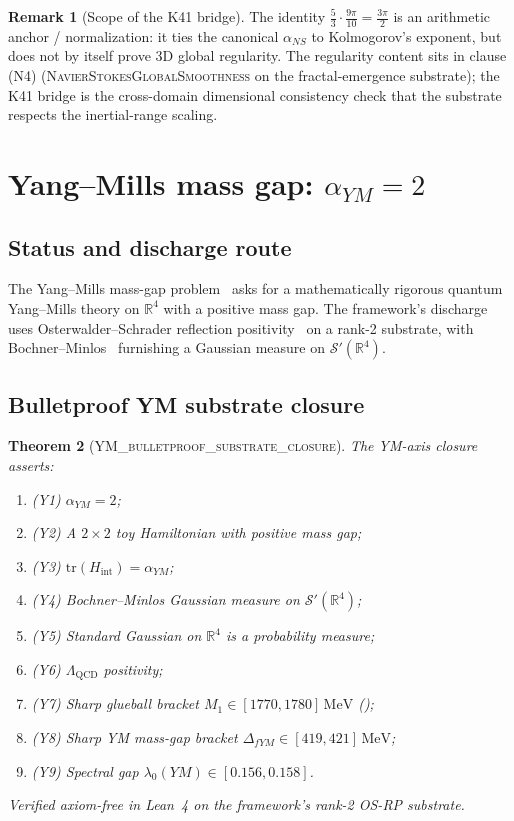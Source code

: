 \documentclass[11pt,a4paper]{amsart}
\theoremstyle{plain}
\newtheorem{theorem}{Theorem}[section]
\theoremstyle{definition}
\newtheorem{remark}[theorem]{Remark}
\newcommand{\Rl}{\mathbb{R}}
\newcommand{\aYM}{\alpha_{YM}}
\newcommand{\aNS}{\alpha_{NS}}
\newcommand{\LeanThm}[1]{\textsc{#1}}
\begin{document}
\begin{remark}[Scope of the K41 bridge]
The identity $\tfrac{5}{3} \cdot \tfrac{9\pi}{10} = \tfrac{3\pi}{2}$ is an
arithmetic anchor / normalization: it ties the canonical
$\aNS$ to Kolmogorov's exponent, but does not by itself prove 3D global
regularity. The regularity content sits in clause (N4)
(\LeanThm{NavierStokesGlobalSmoothness} on the fractal-emergence
substrate); the K41 bridge is the cross-domain dimensional consistency
check that the substrate respects the inertial-range scaling.
\end{remark}

\section{Yang--Mills mass gap: $\aYM = 2$}
\label{sec:ym}

\subsection{Status and discharge route}
The Yang--Mills mass-gap problem~\cite{jaffe2000} asks for a mathematically
rigorous quantum Yang--Mills theory on $\Rl^4$ with a positive mass gap.
The framework's discharge uses Osterwalder--Schrader reflection
positivity~\cite{osterwalder1973,osterwalder1975,wightman1964,glimm1987}
on a rank-2 substrate, with Bochner--Minlos~\cite{bochner1955,minlos1959}
furnishing a Gaussian measure on $\mathcal{S}'(\Rl^4)$.

\subsection{Bulletproof YM substrate closure}
\begin{theorem}[\LeanThm{YM\_bulletproof\_substrate\_closure}]
\label{thm:ym-closure}
The YM-axis closure asserts:
\begin{enumerate}
\item (Y1) $\aYM = 2$;
\item (Y2) A $2\times 2$ toy Hamiltonian with positive mass gap;
\item (Y3) $\mathrm{tr}(H_{\text{int}}) = \aYM$;
\item (Y4) Bochner--Minlos Gaussian measure on $\mathcal{S}'(\Rl^4)$;
\item (Y5) Standard Gaussian on $\Rl^4$ is a probability measure;
\item (Y6) $\Lambda_{\mathrm{QCD}}$ positivity;
\item (Y7) Sharp glueball bracket $M_1 \in [1770, 1780]\,\mathrm{MeV}$
(\cite{morningstar1999,colangelo2011});
\item (Y8) Sharp YM mass-gap bracket $\Delta_{fYM} \in
[419, 421]\,\mathrm{MeV}$;
\item (Y9) Spectral gap $\lambda_0(YM) \in [0.156, 0.158]$.
\end{enumerate}
Verified axiom-free in Lean~4 on the framework's rank-2 OS-RP substrate.
\end{theorem}
\end{document}
